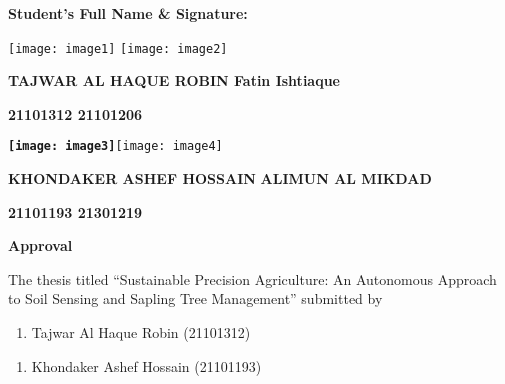 \documentclass{book} %
\begin{document}
\noindent 

\noindent \textbf{Student's Full Name \& Signature: }

      \texttt{[image: image1]}                   \texttt{[image: image2]}               \underbar{            }

\textbf{TAJWAR AL HAQUE ROBIN   Fatin Ishtiaque}

\textbf{21101312      21101206 }



\noindent \textbf{\underbar{}}

\textbf{\underbar{}}

\noindent \textbf{\underbar{}}

\textbf{\texttt{[image: image3]}}\texttt{[image: image4]}\textbf{}

\textbf{KHONDAKER ASHEF HOSSAIN}             \textbf{ALIMUN AL MIKDAD}      \underbar{  }

\textbf{           21101193                                                       21301219}

\noindent \textbf{}

\noindent \textbf{Approval }

\noindent \textbf{}

\noindent \textbf{}

\noindent \textbf{}

\noindent \textbf{}

\noindent \textbf{}

\noindent \textbf{}

\noindent The thesis titled ``Sustainable Precision Agriculture: An Autonomous Approach to Soil Sensing and Sapling Tree Management'' submitted by

\noindent 

\noindent 

\noindent 

\begin{enumerate}
\item  Tajwar Al Haque Robin (21101312)
\end{enumerate}

\noindent 

\begin{enumerate}
\item  Khondaker Ashef Hossain (21101193)
\end{enumerate}
\end{document}
